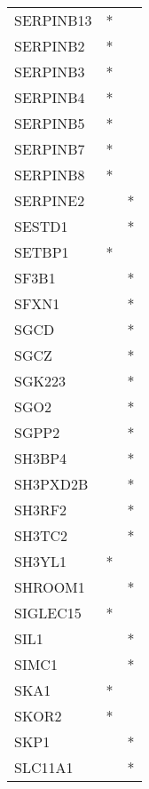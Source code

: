 \begin{longtable}{lcc}
SERPINB13       &              * &            \\
SERPINB2        &              * &            \\
SERPINB3        &              * &            \\
SERPINB4        &              * &            \\
SERPINB5        &              * &            \\
SERPINB7        &              * &            \\
SERPINB8        &              * &            \\
SERPINE2        &                &          * \\
SESTD1          &                &          * \\
SETBP1          &              * &            \\
SF3B1           &                &          * \\
SFXN1           &                &          * \\
SGCD            &                &          * \\
SGCZ            &                &          * \\
SGK223          &                &          * \\
SGO2            &                &          * \\
SGPP2           &                &          * \\
SH3BP4          &                &          * \\
SH3PXD2B        &                &          * \\
SH3RF2          &                &          * \\
SH3TC2          &                &          * \\
SH3YL1          &              * &            \\
SHROOM1         &                &          * \\
SIGLEC15        &              * &            \\
SIL1            &                &          * \\
SIMC1           &                &          * \\
SKA1            &              * &            \\
SKOR2           &              * &            \\
SKP1            &                &          * \\
SLC11A1         &                &          * \\

\end{longtable}
